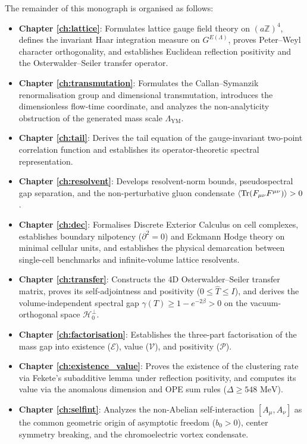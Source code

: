 The remainder of this monograph is organised as follows:
\begin{itemize}
    \item \textbf{Chapter \ref{ch:lattice}}: Formulates lattice gauge field theory on $(a \mathbb{Z})^4$, defines the invariant Haar integration measure on $G^{E(\Lambda)}$, proves Peter--Weyl character orthogonality, and establishes Euclidean reflection positivity and the Osterwalder--Seiler transfer operator.
    \item \textbf{Chapter \ref{ch:transmutation}}: Formulates the Callan--Symanzik renormalisation group and dimensional transmutation, introduces the dimensionless flow-time coordinate, and analyzes the non-analyticity obstruction of the generated mass scale $\Lambda_{\mathrm{YM}}$.
    \item \textbf{Chapter \ref{ch:tail}}: Derives the tail equation of the gauge-invariant two-point correlation function and establishes its operator-theoretic spectral representation.
    \item \textbf{Chapter \ref{ch:resolvent}}: Develops resolvent-norm bounds, pseudospectral gap separation, and the non-perturbative gluon condensate $\langle \mathrm{Tr}(F_{\mu\nu} F^{\mu\nu}) \rangle > 0$.
    \item \textbf{Chapter \ref{ch:dec}}: Formalises Discrete Exterior Calculus on cell complexes, establishes boundary nilpotency ($\partial^2 = 0$) and Eckmann Hodge theory on minimal cellular units, and establishes the physical demarcation between single-cell benchmarks and infinite-volume lattice resolvents.
    \item \textbf{Chapter \ref{ch:transfer}}: Constructs the 4D Osterwalder--Seiler transfer matrix, proves its self-adjointness and positivity ($0 \le \hat{T} \le I$), and derives the volume-independent spectral gap $\gamma(T) \ge 1 - e^{-2\beta} > 0$ on the vacuum-orthogonal space $\mathcal{H}_0^\perp$.
    \item \textbf{Chapter \ref{ch:factorisation}}: Establishes the three-part factorisation of the mass gap into existence ($\mathcal{E}$), value ($\mathcal{V}$), and positivity ($\mathcal{P}$).
    \item \textbf{Chapter \ref{ch:existence_value}}: Proves the existence of the clustering rate via Fekete's subadditive lemma under reflection positivity, and computes its value via the anomalous dimension and OPE sum rules ($\Delta \ge 548\text{ MeV}$).
    \item \textbf{Chapter \ref{ch:selfint}}: Analyzes the non-Abelian self-interaction $[A_\mu, A_\nu]$ as the common geometric origin of asymptotic freedom ($b_0 > 0$), center symmetry breaking, and the chromoelectric vortex condensate.

\end{itemize}
